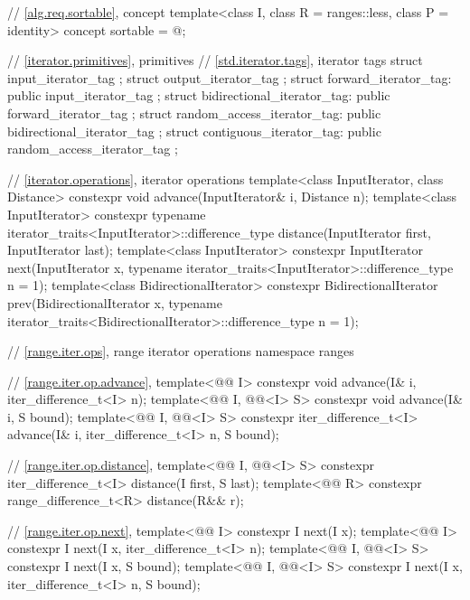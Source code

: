 \begin{codeblock}
{  // \ref{alg.req.sortable}, concept 
  template<class I, class R = ranges::less, class P = identity>
    concept sortable = @\seebelow@;

  // \ref{iterator.primitives}, primitives
  // \ref{std.iterator.tags}, iterator tags
  struct input_iterator_tag { };
  struct output_iterator_tag { };
  struct forward_iterator_tag: public input_iterator_tag { };
  struct bidirectional_iterator_tag: public forward_iterator_tag { };
  struct random_access_iterator_tag: public bidirectional_iterator_tag { };
  struct contiguous_iterator_tag: public random_access_iterator_tag { };

  // \ref{iterator.operations}, iterator operations
  template<class InputIterator, class Distance>
    constexpr void
      advance(InputIterator& i, Distance n);
  template<class InputIterator>
    constexpr typename iterator_traits<InputIterator>::difference_type
      distance(InputIterator first, InputIterator last);
  template<class InputIterator>
    constexpr InputIterator
      next(InputIterator x,
           typename iterator_traits<InputIterator>::difference_type n = 1);
  template<class BidirectionalIterator>
    constexpr BidirectionalIterator
      prev(BidirectionalIterator x,
           typename iterator_traits<BidirectionalIterator>::difference_type n = 1);

  // \ref{range.iter.ops}, range iterator operations
  namespace ranges {
    // \ref{range.iter.op.advance}, 
    template<@@ I>
      constexpr void advance(I& i, iter_difference_t<I> n);
    template<@@ I, @@<I> S>
      constexpr void advance(I& i, S bound);
    template<@@ I, @@<I> S>
      constexpr iter_difference_t<I> advance(I& i, iter_difference_t<I> n, S bound);

    // \ref{range.iter.op.distance}, 
    template<@@ I, @@<I> S>
      constexpr iter_difference_t<I> distance(I first, S last);
    template<@@ R>
      constexpr range_difference_t<R> distance(R&& r);

    // \ref{range.iter.op.next}, 
    template<@@ I>
      constexpr I next(I x);
    template<@@ I>
      constexpr I next(I x, iter_difference_t<I> n);
    template<@@ I, @@<I> S>
      constexpr I next(I x, S bound);
    template<@@ I, @@<I> S>
      constexpr I next(I x, iter_difference_t<I> n, S bound);

}}
\end{codeblock}
